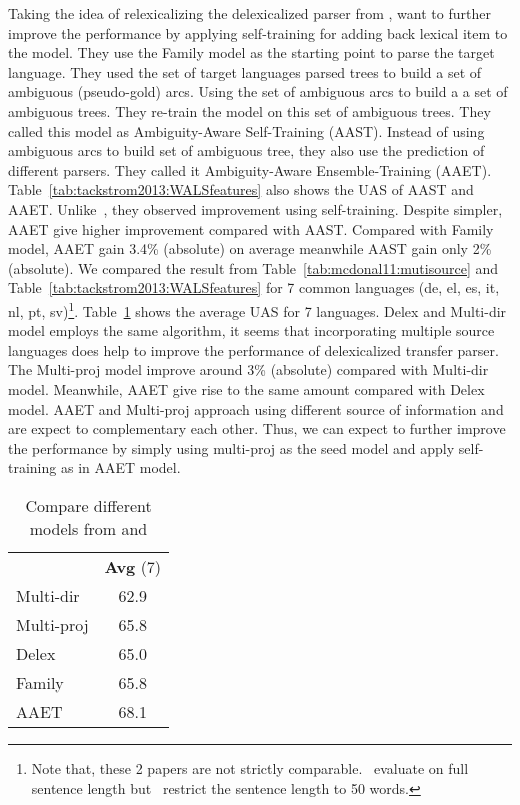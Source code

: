 Taking the idea of relexicalizing the delexicalized parser from \cite{Zeman08cross-languageparser},  want to further improve the performance by applying self-training for adding back lexical item to the model. They use the Family model as the starting point to parse the target language. They used the set of target languages parsed trees to build a set of ambiguous (pseudo-gold) arcs. Using the set of ambiguous arcs to build a a set of ambiguous trees. They re-train the model on this set of ambiguous trees. They called this model as Ambiguity-Aware Self-Training (AAST). Instead of using ambiguous arcs to build set of ambiguous tree, they also use the prediction of different parsers. They called it Ambiguity-Aware Ensemble-Training (AAET). Table~\ref{tab:tackstrom2013:WALSfeatures} also shows the UAS of AAST and AAET. Unlike~, they observed improvement using self-training. Despite simpler, AAET give higher improvement compared with AAST. Compared with Family model, AAET gain 3.4\% (absolute) on average meanwhile AAST gain only 2\% (absolute). We compared the result from Table~\ref{tab:mcdonal11:mutisource} and Table~\ref{tab:tackstrom2013:WALSfeatures} for 7 common languages (de, el, es, it, nl, pt, sv)\footnote{Note that, these 2 papers are not strictly comparable.~ evaluate on full sentence length but~ restrict the sentence length to 50 words.}. Table~\ref{tab:tackstrom13:compare} shows the average UAS for 7 languages. Delex and Multi-dir model employs the same algorithm, it seems that incorporating multiple source languages does help to improve the performance of delexicalized transfer parser. The Multi-proj model improve around 3\% (absolute) compared with Multi-dir model. Meanwhile, AAET give rise to the same amount compared with Delex model. AAET and Multi-proj approach using different source of information and are expect to complementary each other. Thus, we can expect to further improve the performance by simply using multi-proj as the seed model and apply self-training as in AAET model. 
\begin{table}
\centering 
\begin{tabular}{lc}
           & \textbf{Avg} (7)  \\
Multi-dir  & 62.9 \\
Multi-proj & 65.8 \\
Delex      & 65.0 \\
Family     & 65.8 \\
AAET       & 68.1
\end{tabular}
\caption{Compare different models from \protect {} and \protect {}}
\label{tab:tackstrom13:compare}
\end{table}

